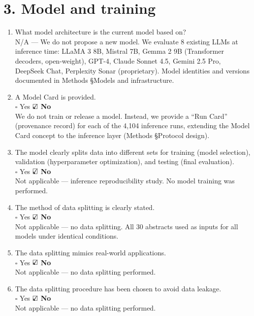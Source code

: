 \documentclass[11pt]{article}
\newcommand{\yes}{\rlap{$\checkmark$}\square}
\newcommand{\no}{\square}
\begin{document}
\section*{3. Model and training}

\begin{enumerate}[label=\Alph*.,leftmargin=2em]
\item What model architecture is the current model based on?\\
{\small N/A --- We do not propose a new model. We evaluate 8 existing LLMs at inference time: LLaMA 3 8B, Mistral 7B, Gemma 2 9B (Transformer decoders, open-weight), GPT-4, Claude Sonnet 4.5, Gemini 2.5 Pro, DeepSeek Chat, Perplexity Sonar (proprietary). Model identities and versions documented in Methods \S Models and infrastructure.}

\item A Model Card is provided.\\
$\no$ Yes \quad $\yes$ \textbf{No}\\
{\small We do not train or release a model. Instead, we provide a ``Run Card'' (provenance record) for each of the 4,104 inference runs, extending the Model Card concept to the inference layer (Methods \S Protocol design).}

\item The model clearly splits data into different sets for training (model selection), validation (hyperparameter optimization), and testing (final evaluation).\\
$\no$ Yes \quad $\yes$ \textbf{No}\\
{\small Not applicable --- inference reproducibility study. No model training was performed.}

\item The method of data splitting is clearly stated.\\
$\no$ Yes \quad $\yes$ \textbf{No}\\
{\small Not applicable --- no data splitting. All 30 abstracts used as inputs for all models under identical conditions.}

\item The data splitting mimics real-world applications.\\
$\no$ Yes \quad $\yes$ \textbf{No}\\
{\small Not applicable --- no data splitting performed.}

\item The data splitting procedure has been chosen to avoid data leakage.\\
$\no$ Yes \quad $\yes$ \textbf{No}\\
{\small Not applicable --- no data splitting performed.}


\end{enumerate}
\end{document}
